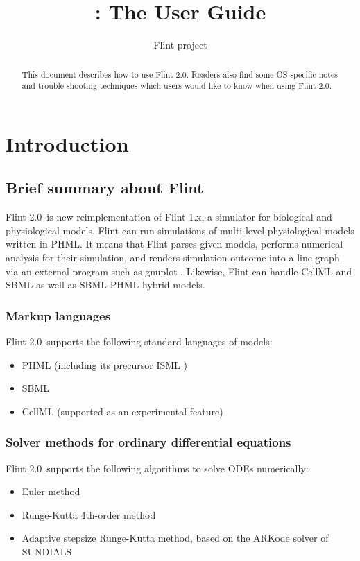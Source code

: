 \documentclass[a4paper,10pt]{report}
\title{\Flint: The User Guide}
\author{Flint project}
\def\FlintVersion{2.0}
\def\Flint{Flint \FlintVersion}
\def\Tagline{a simulator for biological and physiological models}
\begin{document}
\maketitle

\begin{abstract}
This document describes how to use \Flint.
Readers also find some OS-specific notes and trouble-shooting techniques which
users would like to know when using \Flint.
\end{abstract}

\tableofcontents



\chapter{Introduction}

\section{Brief summary about Flint}
\Flint~is new reimplementation of Flint 1.x, \Tagline.
Flint can run simulations of multi-level physiological models written in PHML.
It means that Flint parses given models, performs numerical analysis for their
simulation, and renders simulation outcome into a line graph via an external
program such as gnuplot \cite{gnuplot}.
Likewise, Flint can handle CellML and SBML as well as SBML-PHML hybrid models.

\subsection{Markup languages}
\Flint\ supports the following standard languages of models:
\begin{itemize}
\item PHML \cite{PHML} (including its precursor ISML \cite{ISML})
\item SBML \cite{SBML}
\item CellML \cite{CellML} (supported as an experimental feature)
\end{itemize}

\subsection{Solver methods for ordinary differential equations}
\Flint\ supports the following algorithms to solve ODEs numerically:
\begin{itemize}
\item Euler method
\item Runge-Kutta 4th-order method
\item Adaptive stepsize Runge-Kutta method, based on the ARKode solver of
  SUNDIALS \cite{hindmarsh2005sundials}
\end{itemize}
\end{document}
